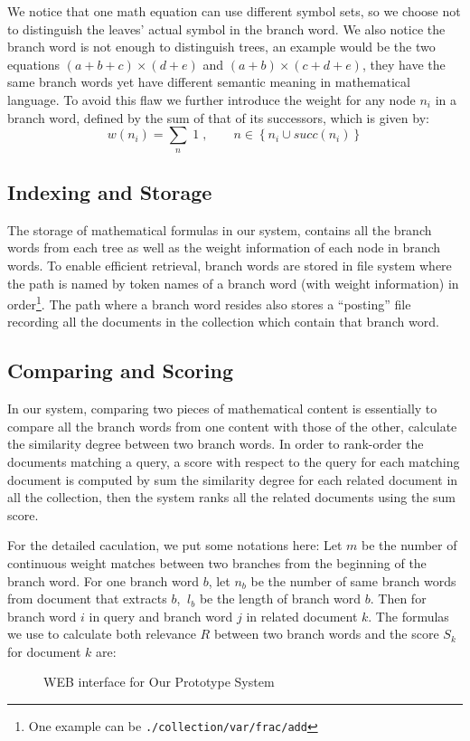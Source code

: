 \documentclass{acm_proc_article-sp}
\begin{document}
We notice that one math equation can use different symbol sets, so we choose not to distinguish the leaves' actual symbol in the branch word. We also notice the branch word is not enough to distinguish trees, an example would be the two equations $(a + b + c)\times (d + e)$ and $(a + b) \times (c + d + e)$, they have the same branch words yet have different semantic meaning in mathematical language. To avoid this flaw we further introduce the weight for any node $n_i$ in a branch word, defined by the sum of that of its successors, which is given by:
$$
w(n_i) = \sum\limits_{n} \; 1 \;, \qquad n \in \left\{n_i \cup succ(n_i) \right\}
$$

\subsection{Indexing and Storage}
The storage of mathematical formulas in our system, contains all the branch words from each tree as well as the weight information of each node in branch words. To enable efficient retrieval, branch words are stored in file system where the path is named by token names of a branch word (with weight information) in order\footnote{One example can be \texttt{./collection/var/frac/add}}. The path where a branch word resides also stores a ``posting'' file recording all the documents in the collection which contain that branch word.

\subsection{Comparing and Scoring}
In our system, comparing two pieces of mathematical content is essentially to compare all the branch words from one content with those of the other, calculate the similarity degree between two branch words. In order to rank-order the documents matching a query, a score with respect to the query for each matching document is computed by sum the similarity degree for each related document in all the collection, then the system ranks all the related documents using the sum score.

For the detailed caculation, we put some notations here: Let $m$ be the number of continuous weight matches between two branches from the beginning of the branch word. For one branch word $b$, let $n_b$ be the number of same branch words from document that extracts $b$, $\  l_b$ be the length of branch word $b$. Then for branch word $i$ in query and branch word $j$ in related document $k$. The formulas we use to calculate both relevance $R$ between two branch words and the score $S_k$ for document $k$ are:
\begin{figure*}
\centering
{}
\caption{WEB interface for Our Prototype System}
\end{figure*}
\end{document}

